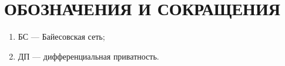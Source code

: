 \chapter*{ОБОЗНАЧЕНИЯ И СОКРАЩЕНИЯ}

\begin{enumerate}
	\item БС --- Байесовская сеть;
	\item ДП --- дифференциальная приватность.
\end{enumerate}